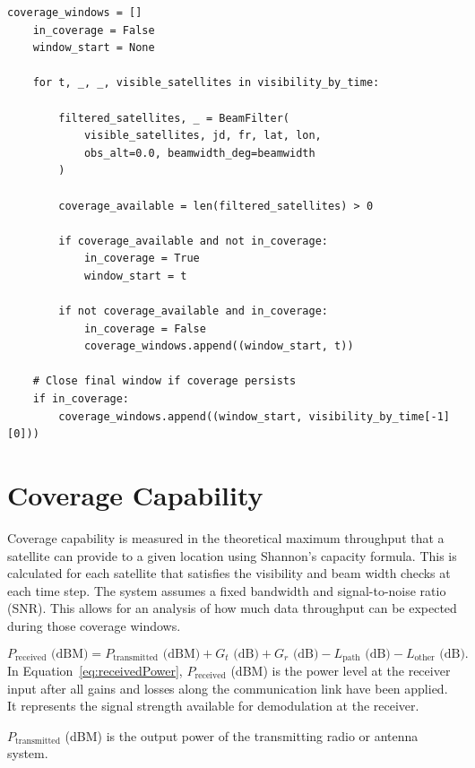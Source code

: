 \begin{lstlisting}[caption={Visibility window logic}, label={lst:Visibility-Window-Logic}]
    coverage_windows = []
    in_coverage = False
    window_start = None

    for t, _, _, visible_satellites in visibility_by_time:

        filtered_satellites, _ = BeamFilter(
            visible_satellites, jd, fr, lat, lon,
            obs_alt=0.0, beamwidth_deg=beamwidth
        )

        coverage_available = len(filtered_satellites) > 0

        if coverage_available and not in_coverage:
            in_coverage = True
            window_start = t

        if not coverage_available and in_coverage:
            in_coverage = False
            coverage_windows.append((window_start, t))

    # Close final window if coverage persists
    if in_coverage:
        coverage_windows.append((window_start, visibility_by_time[-1][0]))

\end{lstlisting}

\section{Coverage Capability}\label{section:coverageCapabilit}
Coverage capability is measured in the theoretical maximum throughput that a satellite can provide to a given location using Shannon's capacity formula. This is calculated for each satellite that satisfies the visibility and beam width checks at each time step. The system assumes a fixed bandwidth and signal-to-noise ratio (SNR). This allows for an analysis of how much data throughput can be expected during those coverage windows.

\begin{equation}
P_{\text{received}} \text{ (dBM)} = P_{\text{transmitted}} \text{ (dBM)} + G_t \text{ (dB)} + G_r \text{ (dB)} - L_{\text{path}} \text{ (dB)} - L_{\text{other}} \text{ (dB)}.
\label{eq:receivedPower}
\end{equation}
In Equation~\eqref{eq:receivedPower},
\(P_{\text{received}}\) (dBM) is the power level at the receiver input after all gains and losses along the communication link have been applied. It represents the signal strength available for demodulation at the receiver.

\(P_{\text{transmitted}}\) (dBM) is the output power of the transmitting radio or antenna system.

